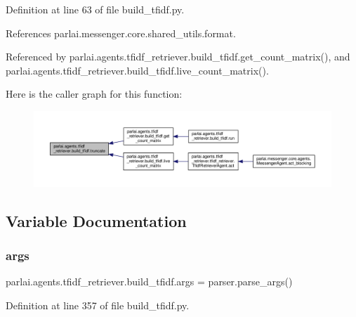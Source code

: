 Definition at line 63 of file build\+\_\+tfidf.\+py.



References parlai.\+messenger.\+core.\+shared\+\_\+utils.\+format.



Referenced by parlai.\+agents.\+tfidf\+\_\+retriever.\+build\+\_\+tfidf.\+get\+\_\+count\+\_\+matrix(), and parlai.\+agents.\+tfidf\+\_\+retriever.\+build\+\_\+tfidf.\+live\+\_\+count\+\_\+matrix().

Here is the caller graph for this function\+:
\nopagebreak
\begin{figure}[H]
\begin{center}
\leavevmode
\includegraphics[width=350pt]{namespaceparlai_1_1agents_1_1tfidf__retriever_1_1build__tfidf_a5bd546d494142d2d7e2772a3d60583f9_icgraph}
\end{center}
\end{figure}


\subsection{Variable Documentation}
\mbox{\label{namespaceparlai_1_1agents_1_1tfidf__retriever_1_1build__tfidf_aa48318cbcc3882ee8fe371c672cbf941}} 
\subsubsection{\texorpdfstring{args}{args}}
{\footnotesize\ttfamily parlai.\+agents.\+tfidf\+\_\+retriever.\+build\+\_\+tfidf.\+args = parser.\+parse\+\_\+args()}



Definition at line 357 of file build\+\_\+tfidf.\+py.

\mbox{\label{namespaceparlai_1_1agents_1_1tfidf__retriever_1_1build__tfidf_a0a314a0288fcdf731f21e279e9f7b27a}} 
